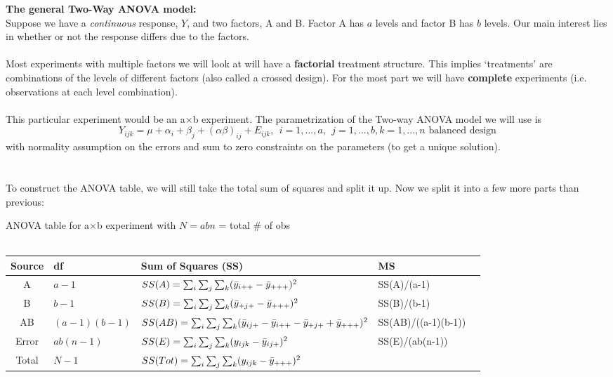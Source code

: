\newpage
\textbf{The general Two-Way ANOVA model:}\\
Suppose we have a \textit{continuous} response, $Y$, and two factors, A and B.  Factor A has $a$ levels and factor B has $b$ levels.  Our main interest lies in whether or not the response differs due to the factors. \\~\\
Most experiments with multiple factors we will look at will have a \textbf{factorial} treatment structure.  This implies `treatments' are combinations of the levels of different factors (also called a crossed design).  For the most part we will have \textbf{complete} experiments (i.e. observations at each level combination).  \\~\\
This particular experiment would be an a$\times$b experiment.  The parametrization of the Two-way ANOVA model we will use is
$$Y_{ijk}=\mu+\alpha_{i}+\beta_{j}+(\alpha\beta)_{ij}+E_{ijk},~~i=1,...,a,~~j=1,...,b,k=1,...,n \mbox{ balanced design}$$
with normality assumption on the errors and sum to zero constraints on the parameters (to get a unique solution).\\~\\~\\
To construct the ANOVA table, we will still take the total sum of squares and split it up.  Now we split it into a few more parts than previous:
\begin{center}
ANOVA table for a$\times$b experiment with $N=abn$ = total \# of obs\\~\\
\begin{tabular}{c|llll}
Source & df & Sum of Squares (SS) & MS\\\hline
A & $a-1$ & $SS(A)= \sum_i \sum_j \sum_k (\bar{y}_{i+ +}-\bar{y}_{+++})^2$ & SS(A)/(a-1)\\
B & $b-1$ & $SS(B)= \sum_i \sum_j \sum_k (\bar{y}_{+j +}-\bar{y}_{+++})^2$ & SS(B)/(b-1) \\
AB & $(a-1)(b-1)$ & $SS(AB)= \sum_i \sum_j \sum_k (\bar{y}_{ij +}-\bar{y}_{i+ +}-\bar{y}_{+j +}+\bar{y}_{+++})^2$ & SS(AB)/((a-1)(b-1)) \\
Error & $ab(n-1)$ & $SS(E)=\sum_i \sum_j \sum_k (y_{ijk}-\bar{y}_{ij +})^2$ & SS(E)/(ab(n-1))\\
Total & $N-1$ & $SS(Tot)= \sum_i \sum_j \sum_k (y_{ijk}-\bar{y}_{+++})^2$ & \\
\end{tabular}
\end{center}

